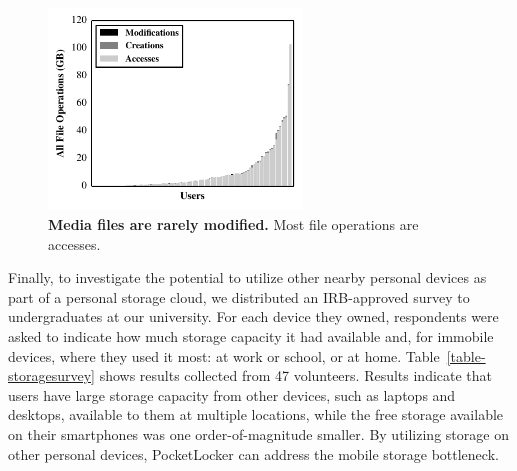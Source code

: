 \begin{figure}

\vspace*{-0.4in}

\includegraphics[width=0.6\textwidth]{./figures/pocketlocker/OperationPercentageGraph.pdf}

\vspace*{-0.1in}

\caption{\small \textbf{Media files are rarely modified.} Most file
operations are accesses.}

\label{fig-motivation-modification}

\vspace*{-0.3in}

\end{figure}

Finally, to investigate the potential to utilize other nearby personal
devices as part of a personal storage cloud, we distributed an IRB-approved
survey to undergraduates at our university. For each device they owned,
respondents were asked to indicate how much storage capacity it had available
and, for immobile devices, where they used it most: at work or school, or at
home. Table~\ref{table-storagesurvey} shows results collected from 47
volunteers. Results indicate that users have large storage capacity from
other devices, such as laptops and desktops, available to them at multiple
locations, while the free storage available on their smartphones was one
order-of-magnitude smaller. By utilizing storage on other personal devices,
PocketLocker can address the mobile storage bottleneck.
